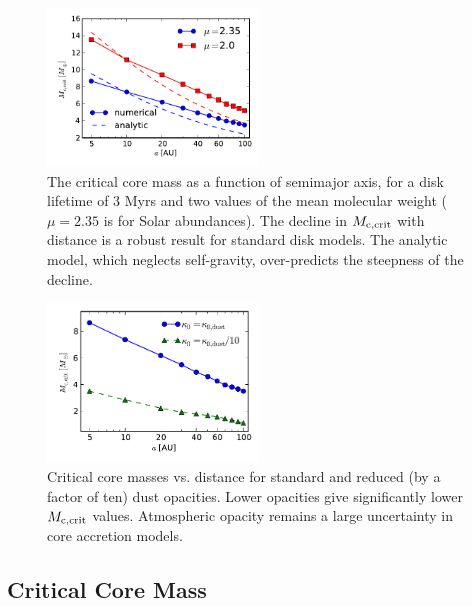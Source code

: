 \documentclass[apj, numberedappendix]{emulateapj}
\def\crit{_{\rm{c, crit}}}
\begin{document}
\begin{figure}[htb]
\centering
\includegraphics[width=0.5\textwidth]{../../figs/ModelAtmospheres/RadSelfGravPoly/PaperFigs/Mcrit_vs_a_3Myrs_new.pdf}
\caption{The critical core mass as a function of semimajor axis, for a disk lifetime of $3$ Myrs and two values of the mean molecular weight ($\mu = 2.35$ is for Solar abundances). The decline in $M_{\rm c,crit}$ with distance is a robust result for standard disk models.  The analytic model, which neglects self-gravity, over-predicts the steepness of the decline.}
\label{fig:Mcvsa}
\end{figure}

\begin{figure}[htb]
\centering
\includegraphics[width=0.5\textwidth]{../../figs/ModelAtmospheres/RadSelfGravPoly/PaperFigs/Mcrit_vs_a_3Myrs_opacity.pdf}
\caption{Critical core masses vs. distance for standard and reduced (by a factor of ten) dust opacities.  Lower opacities give significantly lower $M\crit$ values.  Atmospheric opacity remains a large uncertainty in core accretion models.}
\label{fig:Mcritopacity}
\end{figure}

\subsection{Critical Core Mass}
\label{sec:critcore}
\end{document}
